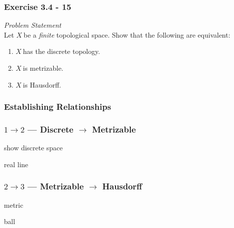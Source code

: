 
\newcommand{\topx}{\ensuremath{X~}}
\newcommand{\catTop}{\textsf{Top}}

\begin{frame}
    \frametitle{Exercise 3.4 - 15}
    \textit{Problem Statement}\\
    Let \topx be a \emph{finite} topological space. Show that the following are
    equivalent:
    \begin{enumerate}
        \item \topx has the discrete topology.
        \item \topx is metrizable.
        \item \topx is Hausdorff.
    \end{enumerate}
\end{frame}

\begin{frame}
    \frametitle{Establishing Relationships}
    \centering

\end{frame}

\begin{frame}
    \frametitle{\(1 \rightarrow 2\) --- Discrete \(\rightarrow\) Metrizable}

    show discrete space

    \pause

    real line

\end{frame}

\begin{frame}
    \frametitle{\(2 \rightarrow 3\) --- Metrizable \(\rightarrow\) Hausdorff}

    metric

    ball

\end{frame}

